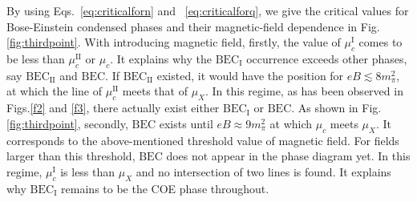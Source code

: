 \documentclass[prd, showpacs,nofootinbib,amsmath,amssymb,12pt]{revtex4}
\begin{document}
By using Eqs.~\eqref{eq:criticalforn} and ~\eqref{eq:criticalforq}, we give the critical values for Bose-Einstein condensed phases and their magnetic-field dependence in Fig.\ref{fig:thirdpoint}.
With introducing magnetic field, firstly, the value of $\mu_c^\text{I}$ comes to be less than  $\mu_c^\text{II}$ or $\mu_c$. It explains why the $\text{BEC}_\text{I}$ occurrence exceeds other phases, say $\text{BEC}_\text{II}$ and $\text{BEC}$.
If $\text{BEC}_\text{II}$ existed, it would have the position for $eB \lesssim  8 m_\pi^2$, at which the line of $\mu_c^\text{II}$ meets that of $\mu_X$. In this regime, as has been observed in Figs.\ref{f2} and \ref{f3}, there actually exist either $\text{BEC}_\text{I}$ or $\text{BEC}$.
As shown in Fig.\ref{fig:thirdpoint}, secondly, $\text{BEC}$ exists 
until $eB \approx 9m_\pi^2$ at which $\mu_c$ meets $\mu_X$.
It corresponds to the above-mentioned threshold value of magnetic field.
For fields larger than this threshold, $\text{BEC}$ does not appear in the phase diagram yet.
In this regime, $\mu_c^\text{I}$ is less than $\mu_X$ and no intersection of two lines is found. It explains why $\text{BEC}_\text{I}$ remains to be the COE phase throughout. 
\end{document}
